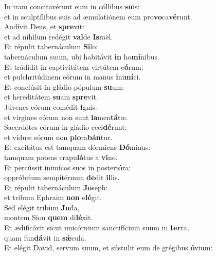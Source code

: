 \evenverse In iram concitavérunt eum in cóllibus \textbf{su}is:~\*\\
\evenverse et in sculptílibus suis ad æmulatiónem eum pro\textbf{vo}ca\textbf{vé}runt.\\
\oddverse Audívit Deus, et \textbf{spre}vit:~\*\\
\oddverse et ad níhilum redégit \textbf{val}de \textbf{Is}raël.\\
\evenverse Et répulit tabernáculum \textbf{Si}lo:~\*\\
\evenverse tabernáculum suum, ubi habitávit \textbf{in} ho\textbf{mí}nibus.\\
\oddverse Et trádidit in captivitátem virtútem e\textbf{ó}rum:~\*\\
\oddverse et pulchritúdinem eórum in manus \textbf{i}ni\textbf{mí}ci.\\
\evenverse Et conclúsit in gládio pópulum \textbf{su}um:~\*\\
\evenverse et hereditátem \textbf{su}am \textbf{spre}vit.\\
\oddverse Júvenes eórum comédit \textbf{i}gnis:~\*\\
\oddverse et vírgines eórum non sunt \textbf{la}men\textbf{tá}tæ.\\
\evenverse Sacerdótes eórum in gládio ceci\textbf{dé}runt:~\*\\
\evenverse et víduæ eórum non \textbf{plo}ra\textbf{bán}tur.\\
\oddverse Et excitátus est tamquam dórmiens \textbf{Dó}minus:~\*\\
\oddverse tamquam potens crapu\textbf{lá}tus a \textbf{vi}no.\\
\evenverse Et percússit inimícos suos in posteri\textbf{ó}ra:~\*\\
\evenverse oppróbrium sempitérnum \textbf{de}dit \textbf{il}lis.\\
\oddverse Et répulit tabernáculum \textbf{Jo}seph:~\*\\
\oddverse et tribum Ephraim \textbf{non} e\textbf{lé}git.\\
\evenverse Sed elégit tribum \textbf{Ju}da,~\*\\
\evenverse montem Sion \textbf{quem} di\textbf{lé}xit.\\
\oddverse Et ædificávit sicut unicórnium sanctifícium suum in \textbf{ter}ra,~\*\\
\oddverse quam fun\textbf{dá}vit in \textbf{sǽ}cula.\\
\evenverse Et elégit David, servum suum, et sústulit eum de grégibus \textbf{ó}vium:~\*\\
